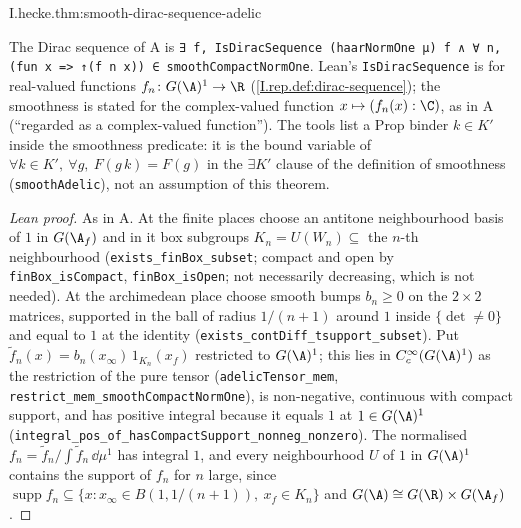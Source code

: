 \begin{tfformal}{I.hecke.thm:smooth-dirac-sequence-adelic}
\begin{tffidelity}
The Dirac sequence of A is \texttt{∃ f, IsDiracSequence (haarNormOne μ) f ∧ ∀ n, (fun x => ↑(f n x)) ∈ smoothCompactNormOne}. Lean's \texttt{IsDiracSequence} is for real-valued functions $f_n\colon G(\A)^1\to\R$ (\cref{I.rep.def:dirac-sequence}); the smoothness is stated for the complex-valued function $x\mapsto(f_n(x):\C)$, as in A (``regarded as a complex-valued function''). The tools list a Prop binder $k\in K'$ inside the smoothness predicate: it is the bound variable of $\forall k\in K',\ \forall g,\ F(g\,k)=F(g)$ in the $\exists K'$ clause of the definition of smoothness (\texttt{smoothAdelic}), not an assumption of this theorem.
\end{tffidelity}
\end{tfformal}
\begin{proof}[Lean proof]
As in A. At the finite places choose an antitone neighbourhood basis of $1$ in $G(\A_f)$ and in it box subgroups $K_n=U(W_n)\subseteq$ the $n$-th neighbourhood (\texttt{exists\_finBox\_subset}; compact and open by \texttt{finBox\_isCompact}, \texttt{finBox\_isOpen}; not necessarily decreasing, which is not needed). At the archimedean place choose smooth bumps $b_n\ge0$ on the $2\times2$ matrices, supported in the ball of radius $1/(n+1)$ around $1$ inside $\{\det\ne0\}$ and equal to $1$ at the identity (\texttt{exists\_contDiff\_tsupport\_subset}). Put $\tilde f_n(x)=b_n(x_\infty)\,1_{K_n}(x_f)$ restricted to $G(\A)^1$; this lies in $C_c^\infty(G(\A)^1)$ as the restriction of the pure tensor (\texttt{adelicTensor\_mem}, \texttt{restrict\_mem\_smoothCompactNormOne}), is non-negative, continuous with compact support, and has positive integral because it equals $1$ at $1\in G(\A)^1$ (\texttt{integral\_pos\_of\_hasCompactSupport\_nonneg\_nonzero}). The normalised $f_n=\tilde f_n/\int\tilde f_n\,\dd\mu^1$ has integral $1$, and every neighbourhood $U$ of $1$ in $G(\A)^1$ contains the support of $f_n$ for $n$ large, since $\operatorname{supp}f_n\subseteq\{x:x_\infty\in B(1,1/(n+1)),\ x_f\in K_n\}$ and $G(\A)\cong G(\R)\times G(\A_f)$.
\end{proof}

